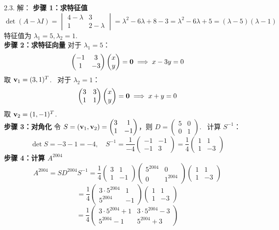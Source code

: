 \begin{exer}
2.3. 解：
\textbf{步骤 1：求特征值}
$$ \det(A-\lambda I) = \begin{vmatrix} 4-\lambda & 3 \\ 1 & 2-\lambda \end{vmatrix} = \lambda^2 - 6\lambda + 8 - 3 = \lambda^2 - 6\lambda + 5 = (\lambda-5)(\lambda-1) $$
特征值为 $\lambda_1 = 5, \lambda_2 = 1$.~
\\
\textbf{步骤 2：求特征向量}
对于 $\lambda_1 = 5$：
$$ \begin{pmatrix} -1 & 3 \\ 1 & -3 \end{pmatrix} \begin{pmatrix} x \\ y \end{pmatrix} = \mathbf{0} \implies x - 3y = 0 $$
取 $\mathbf{v}_1 = (3, 1)^T$.~
对于 $\lambda_2 = 1$：
$$ \begin{pmatrix} 3 & 3 \\ 1 & 1 \end{pmatrix} \begin{pmatrix} x \\ y \end{pmatrix} = \mathbf{0} \implies x + y = 0 $$
取 $\mathbf{v}_2 = (1, -1)^T$.~
\\
\textbf{步骤 3：对角化}
令 $S = (\mathbf{v}_1, \mathbf{v}_2) = \begin{pmatrix} 3 & 1 \\ 1 & -1 \end{pmatrix}$，则 $D = \begin{pmatrix} 5 & 0 \\ 0 & 1 \end{pmatrix}$.~
计算 $S^{-1}$：
$$ \det S = -3 - 1 = -4, \quad S^{-1} = \frac{1}{-4} \begin{pmatrix} -1 & -1 \\ -1 & 3 \end{pmatrix} = \frac{1}{4} \begin{pmatrix} 1 & 1 \\ 1 & -3 \end{pmatrix} $$
\textbf{步骤 4：计算 $A^{2004}$}
$$ A^{2004} = S D^{2004} S^{-1} = \frac{1}{4} \begin{pmatrix} 3 & 1 \\ 1 & -1 \end{pmatrix} \begin{pmatrix} 5^{2004} & 0 \\ 0 & 1^{2004} \end{pmatrix} \begin{pmatrix} 1 & 1 \\ 1 & -3 \end{pmatrix} $$
$$ = \frac{1}{4} \begin{pmatrix} 3 \cdot 5^{2004} & 1 \\ 5^{2004} & -1 \end{pmatrix} \begin{pmatrix} 1 & 1 \\ 1 & -3 \end{pmatrix} $$
$$ = \frac{1}{4} \begin{pmatrix} 3 \cdot 5^{2004} + 1 & 3 \cdot 5^{2004} - 3 \\ 5^{2004} - 1 & 5^{2004} + 3 \end{pmatrix} $$


\end{exer}
